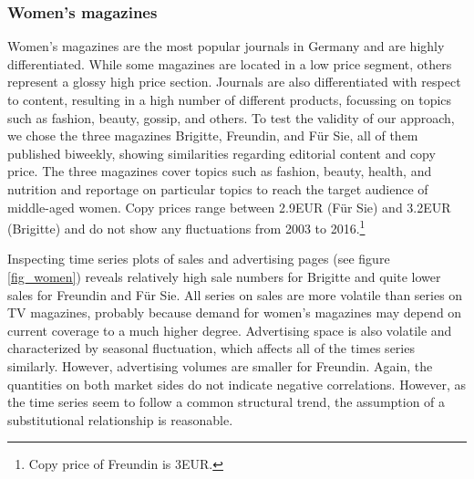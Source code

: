 \documentclass[12pt,a4paper,notitlepage]{article}
\begin{document}
\subsubsection{Women's magazines}

Women's magazines are the most popular journals in Germany and are highly differentiated. While some magazines are located in a low price segment, others represent a glossy high price section. Journals are also differentiated with respect to content, resulting in a high number of different products, focussing on topics such as fashion, beauty, gossip, and others. To test the validity of our approach, we chose the three magazines Brigitte, Freundin, and Für Sie, all of them published biweekly, showing similarities regarding editorial content and copy price. The three magazines cover topics such as fashion, beauty, health, and nutrition and reportage on particular topics to reach the target audience of middle-aged women. Copy prices range between 2.9EUR (Für Sie) and 3.2EUR (Brigitte) and do not show any fluctuations from 2003 to 2016.\footnote{Copy price of Freundin is 3EUR.} 

Inspecting time series plots of sales and advertising pages (see figure \ref{fig_women}) reveals relatively high sale numbers for Brigitte and quite lower sales for Freundin and Für Sie. All series on sales are more volatile than series on TV magazines, probably because demand for women's magazines may depend on current coverage to a much higher degree. Advertising space is also volatile and characterized by seasonal fluctuation, which affects all of the times series similarly. However, advertising volumes are smaller for Freundin. Again, the quantities on both market sides do not indicate negative correlations. However, as the time series seem to follow a common structural trend, the assumption of a substitutional relationship is reasonable. 
\end{document}
